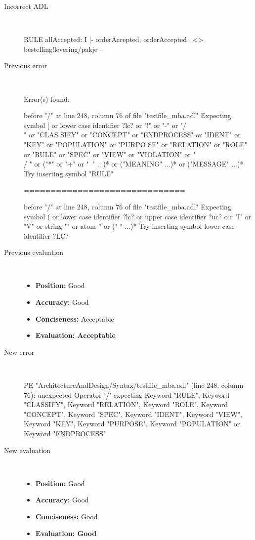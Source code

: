 \begin{description}
  \item[Incorrect ADL]~\\
\begin{adl}
RULE allAccepted: I |- orderAccepted; orderAccepted~ <> bestelling!levering/pakje --\end{adl}
  \item[Previous error]~\\
\begin{haskell}
Error(s) found:

before "/" at line 248, column 76 of file "testfile_mba.adl"
Expecting symbol [ or lower case identifier ?lc? or "!" or "-" or "/\\" or "CLAS
SIFY" or "CONCEPT" or "ENDPROCESS" or "IDENT" or "KEY" or "POPULATION" or "PURPO
SE" or "RELATION" or "ROLE" or "RULE" or "SPEC" or "VIEW" or "VIOLATION" or "\\/
" or ("*" or "+" or "~" ...)* or ("MEANING" ...)* or ("MESSAGE" ...)*
Try inserting symbol "RULE"

==============================

before "/" at line 248, column 76 of file "testfile_mba.adl"
Expecting symbol ( or lower case identifier ?lc? or upper case identifier ?uc? o
r "I" or "V" or string "" or atom '' or ("-" ...)*
Try inserting symbol lower case identifier ?LC?\end{haskell}
  \item[Previous evaluation]~\\
    \begin{itemize}
    \item \textbf{Position:} Good
    \item \textbf{Accuracy:} Good
    \item \textbf{Conciseness:} Acceptable
    \item \textbf{Evaluation: Acceptable}
    \end{itemize}
  \item[New error]~\\
\begin{haskell}
PE "ArchitectureAndDesign/Syntax/testfile_mba.adl" (line 248, column 76):
unexpected Operator '/'
expecting Keyword "RULE", Keyword "CLASSIFY", Keyword "RELATION", Keyword "ROLE", Keyword "CONCEPT", Keyword "SPEC", Keyword "IDENT", Keyword "VIEW", Keyword "KEY", Keyword "PURPOSE", Keyword "POPULATION" or Keyword "ENDPROCESS"
\end{haskell}
  \item[New evaluation]~\\
    \begin{itemize}
    \item \textbf{Position:} Good
    \item \textbf{Accuracy:} Good
    \item \textbf{Conciseness:} Good
    \item \textbf{Evaluation: Good}
    \end{itemize}
  \end{description}

